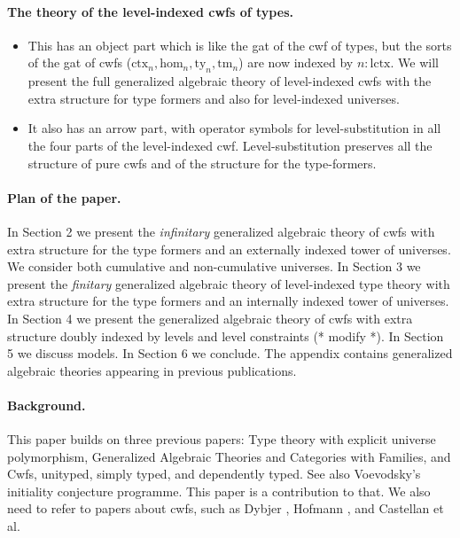 \documentclass[11pt,a4paper]{article}
\theoremstyle{definition}
\newcommand{\Ctx}{\mathrm{Ctx}}
\newcommand{\Ty}{\mathrm{Ty}}
\newcommand{\Tm}{\mathrm{Tm}}
\def\Ctx{\mathrm{ctx}}
\def\Ty{\mathrm{ty}}
\def\Tm{\mathrm{tm}}
\def\Hom{\mathrm{hom}}
\def\lctx{\mathrm{lctx}}
\begin{document}
\paragraph{The theory of the level-indexed cwfs of types.} 
\begin{itemize}
\item This has an object part which is like the gat of the cwf of types, but the sorts of the gat of cwfs ($\Ctx_n,\Hom_n,\Ty_n,\Tm_n$) are now indexed by $n : \lctx$. We will present the full generalized algebraic theory of level-indexed cwfs with the extra structure for type formers and also for  level-indexed universes.
\item It also has an arrow part, with operator symbols for level-substitution in all the four parts of the level-indexed cwf. Level-substitution preserves all the structure of pure cwfs and of the structure for the type-formers.
\end{itemize}

\paragraph{Plan of the paper.} In Section 2 we present the {\em infinitary} generalized algebraic theory of cwfs with extra structure for the type formers and an externally indexed tower of universes. We consider both cumulative and non-cumulative universes. In Section 3 we present the {\em finitary} generalized algebraic theory of level-indexed type theory with extra structure for the type formers and an internally indexed tower of universes. In Section 4 we present the generalized algebraic theory of cwfs with extra structure doubly indexed by levels and level constraints (* modify *). In Section 5 we discuss models. In Section 6 we conclude. The appendix contains generalized algebraic theories appearing in previous publications. 

\paragraph{Background.} This paper builds on three previous papers: Type theory with explicit universe polymorphism, Generalized Algebraic Theories and Categories with Families, and Cwfs, unityped, simply typed, and dependently typed. See also Voevodsky's initiality conjecture programme. This paper is a contribution to that. We also need to refer to papers about cwfs, such as Dybjer \cite{dybjer:torino}, Hofmann \cite{hofmann:cambridge}, and Castellan et al. 
\end{document}
